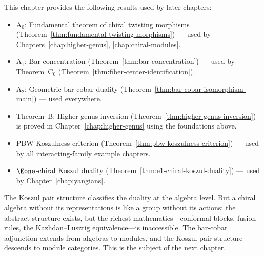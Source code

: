 \begin{remark}\label{rem:ckp-dependency-digest}
This chapter provides the following results used by later chapters:
\begin{itemize}
\item $\mathrm{A}_0$: Fundamental theorem of chiral twisting morphisms
  (Theorem~\ref{thm:fundamental-twisting-morphisms}) --- used by
  Chapters~\ref{chap:higher-genus}, \ref{chap:chiral-modules}.
\item $\mathrm{A}_1$: Bar concentration
  (Theorem~\ref{thm:bar-concentration}) --- used by
  Theorem~$\mathrm{C}_0$
  (Theorem~\ref{thm:fiber-center-identification}).
\item $\mathrm{A}_2$: Geometric bar-cobar duality
  (Theorem~\ref{thm:bar-cobar-isomorphism-main}) --- used
  everywhere.
\item Theorem~B: Higher genus inversion
  (Theorem~\ref{thm:higher-genus-inversion}) is
  proved in Chapter~\ref{chap:higher-genus} using the foundations
  above.
\item PBW Koszulness criterion
  (Theorem~\ref{thm:pbw-koszulness-criterion}) --- used by all
  interacting-family example chapters.
\item $\Eone$-chiral Koszul duality
  (Theorem~\ref{thm:e1-chiral-koszul-duality}) --- used by
  Chapter~\ref{chap:yangians}.
\end{itemize}
\end{remark}

The Koszul pair structure classifies the duality at the algebra level.
But a chiral algebra without its representations is like a group without
its actions: the abstract structure exists, but the richest
mathematics---conformal blocks, fusion rules, the Kazhdan--Lusztig
equivalence---is inaccessible.  The bar-cobar adjunction extends from
algebras to modules, and the Koszul pair structure descends to module
categories.  This is the subject of the next chapter.
